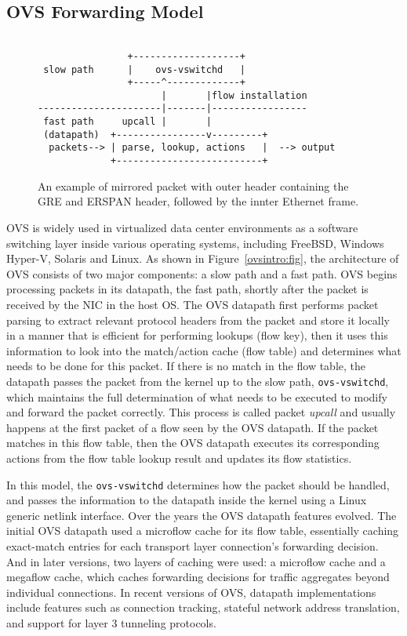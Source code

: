 \documentclass[10pt]{sigplanconf}
\begin{document}
\subsection{OVS Forwarding Model}

\begin{figure}
{\scriptsize
\begin{verbatim}
              
                +-------------------+
 slow path      |    ovs-vswitchd   |
                +-----^-------------+
                      |       |flow installation
----------------------|-------|-----------------
 fast path     upcall |       | 
 (datapath)  +----------------v---------+ 
  packets--> | parse, lookup, actions   |  --> output
             +--------------------------+
\end{verbatim}
}
\vspace{-1.0em}
\caption{An example of mirrored packet with outer header containing
the GRE and ERSPAN header, followed by the innter Ethernet frame.}
\label{erspanhdr}
\vspace{-1.0em}
\end{figure}

OVS is widely used in virtualized data center environments as a software
switching layer inside various operating systems, including FreeBSD,
Windows Hyper-V, Solaris and Linux. As shown in
Figure~\ref{ovsintro:fig}, the architecture of OVS consists of two major
components: a slow path and a fast path. OVS begins processing packets
in its datapath, the fast path, shortly after the packet is received by the NIC in the host OS.
The OVS datapath first performs packet parsing to extract relevant protocol
headers from the packet and store it locally in a manner that is efficient for
performing lookups (flow key), then it uses this information to look into the
match/action cache (flow table) and determines what needs to be done for this
packet. If there is no match in the flow table, the datapath passes the packet
from the kernel up to the slow path, \verb+ovs-vswitchd+, which maintains the
full determination of what needs to be executed to modify and forward
the packet correctly.  This process is called packet {\em upcall} and
usually happens at the first packet of a flow seen by the OVS datapath.
If the packet matches in this flow table, then the OVS datapath executes its
corresponding actions from the flow table lookup result and updates its flow
statistics.

In this model, the \verb+ovs-vswitchd+ determines how the packet should be handled,
and passes the information to the datapath inside the kernel using a
Linux generic netlink interface.  Over the years the OVS datapath features evolved.
The initial OVS datapath used a microflow cache for its flow table,
essentially caching exact-match entries for each
transport layer connection's forwarding decision.  And in later versions,
two layers of caching were used: a microflow cache and a megaflow cache,
which caches forwarding decisions for traffic aggregates beyond individual
connections.  In recent versions of OVS, datapath implementations include
features such as connection tracking, stateful network address translation, and
support for layer 3 tunneling protocols.
\end{document}
